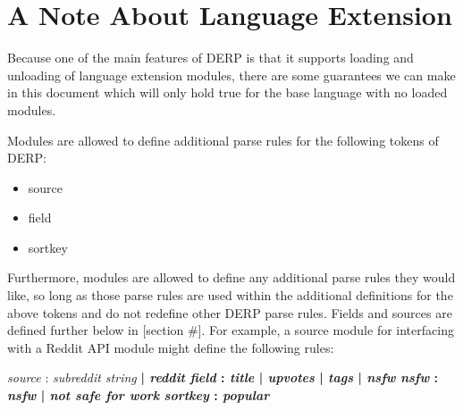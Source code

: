 \section{A Note About Language Extension}
\item Because one of the main features of DERP is that it supports loading and unloading
of language extension modules, there are some guarantees we can make in this document 
which will only hold true for the base language with no loaded modules.

Modules are allowed to define additional parse rules for the following tokens of DERP:
\begin{itemize}
\item source
\item field
\item sortkey
\end{itemize}
Furthermore, modules are allowed to define any additional parse rules they would like, so 
long as those parse rules are used within the additional definitions for the above tokens 
and do not redefine other DERP parse rules. Fields and sources are defined further below in [section #]. 
For example, a source module for interfacing with a Reddit API module might define the following rules:
\begin{center}
    \emph{source} : \emph{subreddit string} \bf{|} \emph{reddit}
    \emph{field} : \emph{title} \bf{|} \emph{upvotes} \bf{|} \emph{tags} \bf{|} \emph{nsfw}
    \emph{nsfw} : \emph {nsfw} \bf{|} \emph{not safe for work}
    \emph{sortkey} : \emph{popular}
\end{center}